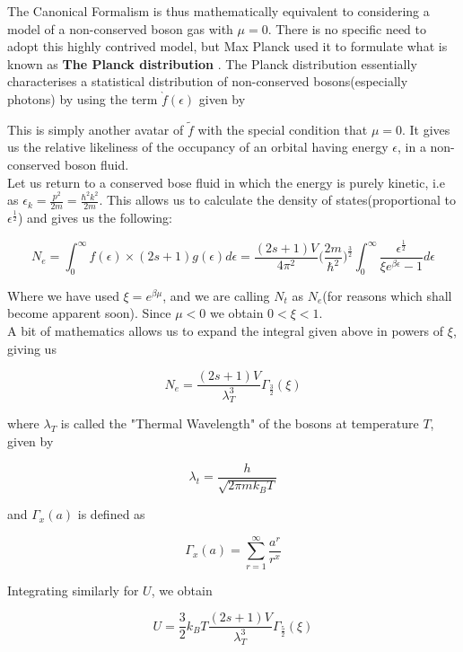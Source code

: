 \documentclass[oneside]{book}
\begin{document}
The Canonical Formalism is thus mathematically equivalent to considering a model of a non-conserved boson gas with $\mu =0$. There is no specific need to adopt this highly contrived model, but Max Planck used it to formulate what is known as \textbf{ The Planck distribution }. The Planck distribution essentially characterises a statistical distribution of non-conserved bosons(especially photons) by using the term $\grave f(\epsilon)$ given by

\begin{center}
\end{center}

This is simply another avatar of $\tilde f$ with the special condition that $\mu = 0$. It gives us the relative likeliness of the occupancy of an orbital having energy $\epsilon$, in a non-conserved boson fluid.\\

Let us return to a conserved bose fluid in which the energy is purely kinetic, i.e as $\epsilon_{k} = \frac{p^2}{2m} =   \frac{\hbar^2k^2}{2m}$. This allows us to calculate the density of states(proportional to $\epsilon^\frac{1}{2}$) and gives us the following:

\[  N_e =  \int_{0}^{\infty}f(\epsilon) \times (2s+1)g(\epsilon)d\epsilon 
= \frac{(2s+1)V}{4\pi^2}\Bigg(\frac{2m}{\hbar^2}\Bigg)^{\frac{3}{2}}\int_{0}^{\infty} \frac{\epsilon^{\frac{1}{2}}}{\xi e^{\beta\epsilon}-1}d\epsilon 
 \]

Where we have used $\xi = e^{\beta\mu}$, and we are calling $N_t$ as $N_e$(for reasons which shall become apparent soon). Since $\mu < 0$ we obtain $0<\xi<1$. \\

A bit of mathematics allows us to expand the integral given above in powers of $\xi$, giving us

\[N_e =  \frac{(2s+1)V}{\lambda_T^3}\Gamma_{\frac{3}{2}}(\xi) \]

where $\lambda_T$ is called the "Thermal Wavelength" of the bosons at temperature $T$, given by

\[ \lambda_t = \frac{h}{\sqrt{2\pi mk_BT}}\]

and $\Gamma_x(a)$ is defined as 

\[\Gamma_x(a) = \sum_{r = 1}^{\infty}\frac{a^r}{r^x} \]

Integrating similarly for $U$, we obtain

\[U = \frac{3}{2}k_BT \frac{(2s+1)V}{\lambda_T^3}\Gamma_{\frac{5}{2}}(\xi) \]
\end{document}
